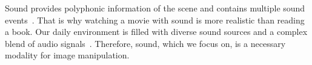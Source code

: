 \documentclass[10pt,twocolumn,letterpaper]{article}
\def\authornote#1#2#3{{\textcolor{#2}{\textsl{\small[#1: #3]}}}}
\newcommand{\wonmin}[1]{\authornote{Wonmin}{Blue}{#1}} %
\newcommand{\sang}[1]{\authornote{Sang}{Green}{#1}}
\begin{document}
%

Sound provides polyphonic information of the scene and contains multiple sound events~\cite{9524590}.
That is why watching a movie with sound is more realistic than reading a book.
Our daily environment is filled with diverse sound sources and a complex blend of audio signals~\cite{9524590}.
Therefore, sound, which we focus on, is a necessary modality for image manipulation.
 
\end{document}
